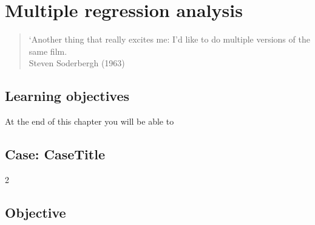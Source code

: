 
\chapter{Multiple regression analysis} %
\label{cha:multiple_regression_analysis}

\begin{quote}
`Another thing that really excites me: I'd like to do multiple versions of the same film.\\
Steven Soderbergh (1963)
\end{quote}



\section*{Learning objectives}
At the end of this chapter you will be able to
\begin{compactitem}
\item 
\item 
\end{compactitem}





\begin{mdframed}[hidealllines=true,backgroundcolor=KPMG_blue!20]
\section*{Case: CaseTitle}
\begin{fullwidth}
\begin{multicols}{2}

\end{multicols}
\end{fullwidth}
\end{mdframed}

\section*{Objective}




